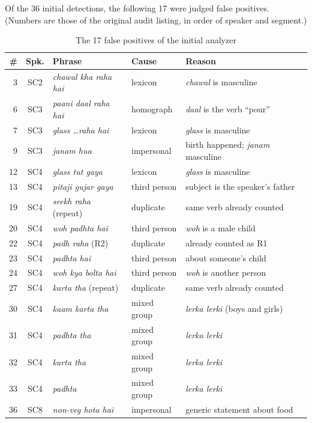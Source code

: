 \documentclass[11pt,a4paper]{report}
\begin{document}
Of the 36 initial detections, the following 17 were judged false positives. (Numbers are those of the original audit listing, in order of speaker and segment.)

\begin{table}[H]
\centering
\caption{The 17 false positives of the initial analyzer}
\label{tab:auditfp}
\small
\begin{tabularx}{\textwidth}{rcllX}
\toprule
\textbf{\#} & \textbf{Spk.} & \textbf{Phrase} & \textbf{Cause} & \textbf{Reason} \\
\midrule
 3 & SC2 & \textit{chawal kha raha hai} & lexicon & \textit{chawal} is masculine \\
 6 & SC3 & \textit{paani daal raha hai} & homograph & \textit{daal} is the verb ``pour'' \\
 7 & SC3 & \textit{glass \ldots raha hai} & lexicon & \textit{glass} is masculine \\
 9 & SC3 & \textit{janam hua} & impersonal & birth happened; \textit{janam} masculine \\
12 & SC4 & \textit{glass tut gaya} & lexicon & \textit{glass} is masculine \\
13 & SC4 & \textit{pitaji gujar gaya} & third person & subject is the speaker's father \\
19 & SC4 & \textit{seekh raha} (repeat) & duplicate & same verb already counted \\
20 & SC4 & \textit{woh padhta hai} & third person & \textit{woh} is a male child \\
22 & SC4 & \textit{padh raha} (R2) & duplicate & already counted as R1 \\
23 & SC4 & \textit{padhta hai} & third person & about someone's child \\
24 & SC4 & \textit{woh kya bolta hai} & third person & \textit{woh} is another person \\
27 & SC4 & \textit{karta tha} (repeat) & duplicate & same verb already counted \\
30 & SC4 & \textit{kaam karta tha} & mixed group & \textit{lerka lerki} (boys and girls) \\
31 & SC4 & \textit{padhta tha} & mixed group & \textit{lerka lerki} \\
32 & SC4 & \textit{karta tha} & mixed group & \textit{lerka lerki} \\
33 & SC4 & \textit{padhta} & mixed group & \textit{lerka lerki} \\
36 & SC8 & \textit{non-veg hota hai} & impersonal & generic statement about food \\
\bottomrule
\end{tabularx}
\end{table}
\end{document}
